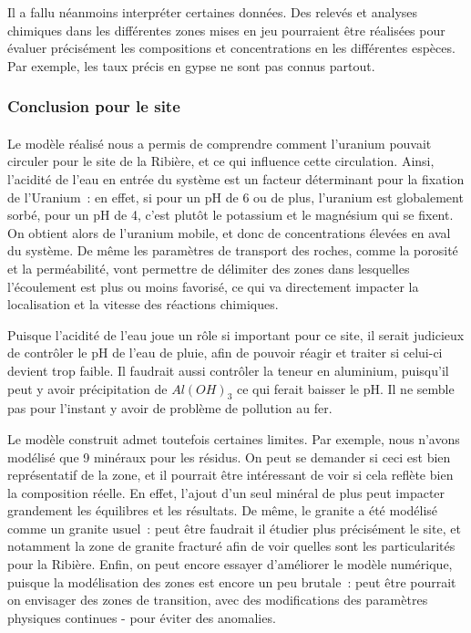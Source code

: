 \documentclass{article}
\begin{document}
Il a fallu néanmoins interpréter certaines données. Des relevés et analyses chimiques dans les différentes zones mises en jeu pourraient être réalisées pour évaluer précisément les compositions et concentrations en les différentes espèces. Par exemple, les taux précis en gypse ne sont pas connus partout.

\subsubsection{Conclusion pour le site}
\paragraph{} Le modèle réalisé nous a permis de comprendre comment l’uranium pouvait circuler pour le site de la Ribière, et ce qui influence cette circulation. Ainsi, l’acidité de l’eau en entrée du système est un facteur déterminant pour la fixation de l’Uranium : en effet, si pour un pH de 6 ou de plus, l’uranium est globalement sorbé, pour un pH de 4, c’est plutôt le potassium et le magnésium qui se fixent. On obtient alors de l’uranium mobile, et donc de concentrations élevées en aval du système. De même les paramètres de transport des roches, comme la porosité et la perméabilité, vont permettre de délimiter des zones dans lesquelles l’écoulement est plus ou moins favorisé, ce qui va directement impacter la localisation et la vitesse des réactions chimiques.

Puisque l’acidité de l’eau joue un rôle si important pour ce site, il serait judicieux de contrôler le pH de l’eau de pluie, afin de pouvoir réagir et traiter si celui-ci devient trop faible. Il faudrait aussi contrôler la teneur en aluminium, puisqu’il peut y avoir précipitation de $Al(OH)_3$ ce qui ferait baisser le pH. Il ne semble pas pour l’instant y avoir de problème de pollution au fer.

Le modèle construit admet toutefois certaines limites. Par exemple, nous n’avons modélisé que 9 minéraux pour les résidus. On peut se demander si ceci est bien représentatif de la zone, et il pourrait être intéressant de voir si cela reflète bien la composition réelle. En effet, l’ajout d’un seul minéral de plus peut impacter grandement les équilibres et les résultats. De même, le granite a été modélisé comme un granite usuel : peut être faudrait il étudier plus précisément le site, et notamment la zone de granite fracturé afin de voir quelles sont les particularités pour la Ribière. Enfin, on peut encore essayer d’améliorer le modèle numérique, puisque la modélisation des zones est encore un peu brutale : peut être pourrait on envisager des zones de transition, avec des modifications des paramètres physiques continues - pour éviter des anomalies.
\end{document}
